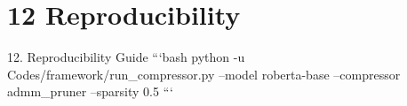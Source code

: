 \section{12 Reproducibility}

 12. Reproducibility Guide
```bash
python -u Codes/framework/run\_compressor.py --model roberta-base --compressor admm\_pruner --sparsity 0.5
```
